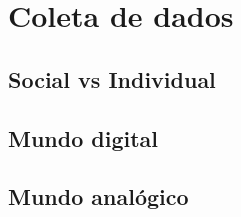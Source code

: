 \chapter{Coleta de dados}

\section{Social vs Individual}
\section{Mundo digital}
\section{Mundo analógico}